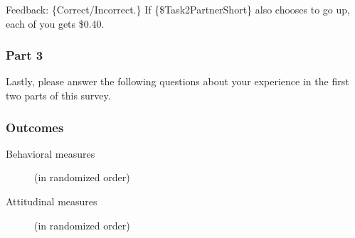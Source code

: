 \begin{description}[listparindent = 1.5em]
    Feedback: \{Correct/Incorrect.\} If \{\$Task2PartnerShort\} also chooses to go up,
    each of you gets \$0.40.
\end{description}

\subsubsection*{Part 3}

Lastly, please answer the following questions about your experience in the first
two parts of this survey.

\subsubsection*{Outcomes}

\begin{description}
    \item[Behavioral measures]  (in randomized order)
    \item[Attitudinal measures]  (in randomized order)
\end{description}

